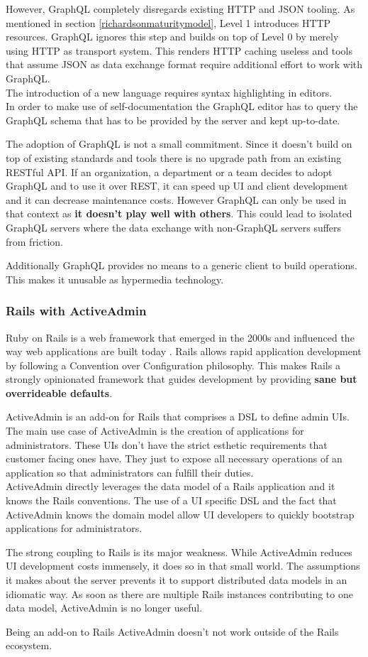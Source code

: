 However, GraphQL completely disregards existing HTTP and JSON tooling. As mentioned in section \ref{richardsonmaturitymodel}, Level 1 introduces HTTP resources. GraphQL ignores this step and builds on top of Level 0 by merely using HTTP as transport system. This renders HTTP caching useless and tools that assume JSON as data exchange format require additional effort to work with GraphQL. \\ The introduction of a new language requires syntax highlighting in editors. \\ In order to make use of self-documentation the GraphQL editor has to query the GraphQL schema that has to be provided by the server and kept up-to-date.

The adoption of GraphQL is not a small commitment. Since it doesn't build on top of existing standards and tools there is no upgrade path from an existing RESTful API. If an organization, a department or a team decides to adopt GraphQL and to use it over REST, it can speed up UI and client development and it can decrease maintenance costs. However GraphQL can only be used in that context as \textbf{it doesn't play well with others}. This could lead to isolated GraphQL servers where the data exchange with non-GraphQL servers suffers from friction.

Additionally GraphQL provides no means to a generic client to build operations. This makes it unusable as hypermedia technology.

\subsubsection{Rails with ActiveAdmin}
Ruby on Rails is a web framework that emerged in the 2000s and influenced the way web applications are built today \citep{rubyonrails}. Rails allows rapid application development by following a Convention over Configuration philosophy. This makes Rails a strongly opinionated framework that guides development by providing \textbf{sane but overrideable defaults}.

ActiveAdmin is an add-on for Rails that comprises a DSL to define admin UIs. The main use case of ActiveAdmin is the creation of applications for administrators. These UIs don't have the strict esthetic requirements that customer facing ones have. They just to expose all necessary operations of an application so that administrators can fulfill their duties. \\ ActiveAdmin directly leverages the data model of a Rails application and it knows the Rails conventions. The use of a UI specific DSL and the fact that ActiveAdmin knows the domain model allow UI developers to quickly bootstrap applications for administrators.

The strong coupling to Rails is its major weakness. While ActiveAdmin reduces UI development costs immensely, it does so in that small world. The assumptions it makes about the server prevents it to support distributed data models in an idiomatic way. As soon as there are multiple Rails instances contributing to one data model, ActiveAdmin is no longer useful.

Being an add-on to Rails ActiveAdmin doesn't not work outside of the Rails ecosystem.
